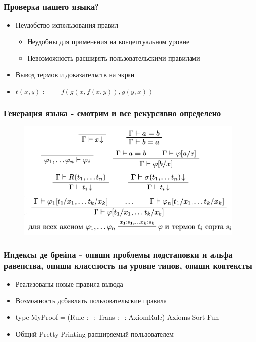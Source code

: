 \documentclass[14pt]{beamer}
\begin{document}
\begin{frame}
\frametitle{Проверка нашего языка?}
\begin{itemize} %
  \item Неудобство использования правил
  \begin{itemize}
    \item Неудобны для применения на концептуальном уровне
    \item Невозможность расширять пользовательскими правилами
  \end{itemize}
  \item Вывод термов и доказательств на экран
  \item $t(x, y) :== f(g(x,f(x,y)), g(y,x))$
\end{itemize}
\end{frame}

\begin{frame}
\frametitle{Генерация языка - смотрим и все рекурсивно определено}
\begin{figure}[H]
  \center
  \includegraphics[width=1.0\linewidth]{vlai2}
\end{figure}
\end{frame}


\begin{frame}
\frametitle{Индексы де брейна - опиши проблемы подстановки и альфа равенства, опиши классность на уровне типов, опиши контексты}
\begin{itemize} %
  \item Реализованы новые правила вывода
  \item Возможность добавлять пользовательские правила \cite{swierstra2008data, bahr2014composing}
  \item type MyProof = (Rule :+: Trans :+: AxiomRule) Axioms Sort Fun
  \item Общий Pretty Printing расширяемый пользователем
\end{itemize}
\end{frame}
\end{document}
